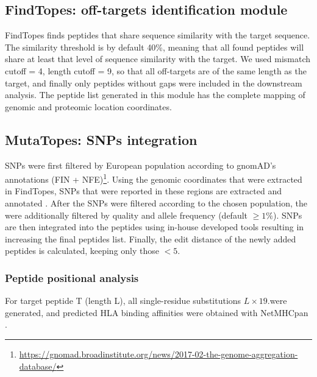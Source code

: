 \documentclass[unnumsec,webpdf,contemporary,large]{oup-authoring-template}%
\theoremstyle{thmstyleone}%
\theoremstyle{thmstyletwo}%
\theoremstyle{thmstylethree}%
\begin{document}
    \subsection{\textbf{FindTopes: off-targets identification module}}\label{sec:findtopes}
        FindTopes finds peptides that share sequence similarity with the target sequence. The similarity threshold is by default 40\%, meaning that all found peptides will share at least that level of sequence similarity with the target. We used mismatch cutoff = 4, length cutoff = 9, so that all off-targets are of the same length as the target, and finally only peptides without gaps were included in the downstream analysis.
        The peptide list generated in this module has the complete mapping of genomic and proteomic location coordinates.

    \subsection{\textbf{MutaTopes: SNPs integration}}\label{sec:mutatopes}
        SNPs were first filtered by European population according to gnomAD's annotations (FIN + NFE)\footnote{\url{https://gnomad.broadinstitute.org/news/2017-02-the-genome-aggregation-database/}}. Using the genomic coordinates that were extracted in FindTopes, SNPs that were reported in these regions are extracted \cite{danecek2021twelve} and annotated \cite{hunt2022annotating}. After the SNPs were filtered according to the chosen population, the were additionally filtered by quality and allele frequency (default $ \geq 1\%$). SNPs are then integrated into the peptides using in-house developed tools resulting in increasing the final peptides list. Finally, the edit distance of the newly added peptides is calculated, keeping only those $<5$. 

        \subsubsection{\textbf{Peptide positional analysis}}\label{sec:xscan}  
            For target peptide T (length L), all single-residue substitutions \(L\times 19\).were generated, and predicted HLA binding affinities were obtained with NetMHCpan \cite{reynisson2020netmhcpan}. 
        
\end{document}
